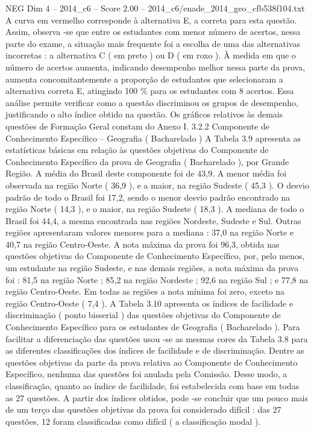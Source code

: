 \begin{textsample}{NEG Dim 4 – 2014\_c6 – Score 2.00 – 2014\_c6/enade\_2014\_geo\_cfb538f104.txt}
A curva em vermelho corresponde à alternativa E, a correta para esta questão.
Assim, observa -se que entre os estudantes com menor número de acertos, nessa parte do exame, a situação mais frequente foi a escolha de uma das alternativas incorretas : a alternativa C ( em preto ) ou D ( em roxo ).
À medida em que o número de acertos aumenta, indicando desempenho melhor nessa parte da prova, aumenta concomitantemente a proporção de estudantes que selecionaram a alternativa correta E, atingindo 100 \% para os estudantes com 8 acertos.
Essa análise permite verificar como a questão discriminou os grupos de desempenho, justificando o alto índice obtido na questão.
Os gráficos relativos às demais questões de Formação Geral constam do Anexo I. 3.2.2 Componente de Conhecimento Específico – Geografia ( Bacharelado ) A Tabela 3.9 apresenta as estatísticas básicas em relação às questões objetivas do Componente de Conhecimento Específico da prova de Geografia ( Bacharelado ), por Grande Região.
A média do Brasil deste componente foi de 43,9.
A menor média foi observada na região Norte ( 36,9 ), e a maior, na região Sudeste ( 45,3 ).
O desvio padrão de todo o Brasil foi 17,2, sendo o menor desvio padrão encontrado na região Norte ( 14,3 ), e o maior, na região Sudeste ( 18,3 ).
A mediana de todo o Brasil foi 44,4, a mesma encontrada nas regiões Nordeste, Sudeste e Sul.
Outras regiões apresentaram valores menores para a mediana : 37,0 na região Norte e 40,7 na região Centro-Oeste.
A nota máxima da prova foi 96,3, obtida nas questões objetivas do Componente de Conhecimento Específico, por, pelo menos, um estudante na região Sudeste, e nas demais regiões, a nota máxima da prova foi : 81,5 na região Norte ; 85,2 na região Nordeste ; 92,6 na região Sul ; e 77,8 na região Centro-Oeste.
Em todas as regiões a nota mínima foi zero, exceto na região Centro-Oeste ( 7,4 ).
A Tabela 3.10 apresenta os índices de facilidade e discriminação ( ponto bisserial ) das questões objetivas do Componente de Conhecimento Específico para os estudantes de Geografia ( Bacharelado ).
Para facilitar a diferenciação das questões usou -se as mesmas cores da Tabela 3.8 para as diferentes classificações dos índices de facilidade e de discriminação.
Dentre as questões objetivas da parte da prova relativa ao Componente de Conhecimento Específico, nenhuma das questões foi anulada pela Comissão.
Desse modo, a classificação, quanto ao índice de facilidade, foi estabelecida com base em todas as 27 questões.
A partir dos índices obtidos, pode -se concluir que um pouco mais de um terço das questões objetivas da prova foi considerado difícil : das 27 questões, 12 foram classificadas como difícil ( a classificação modal ).

\end{textsample}
